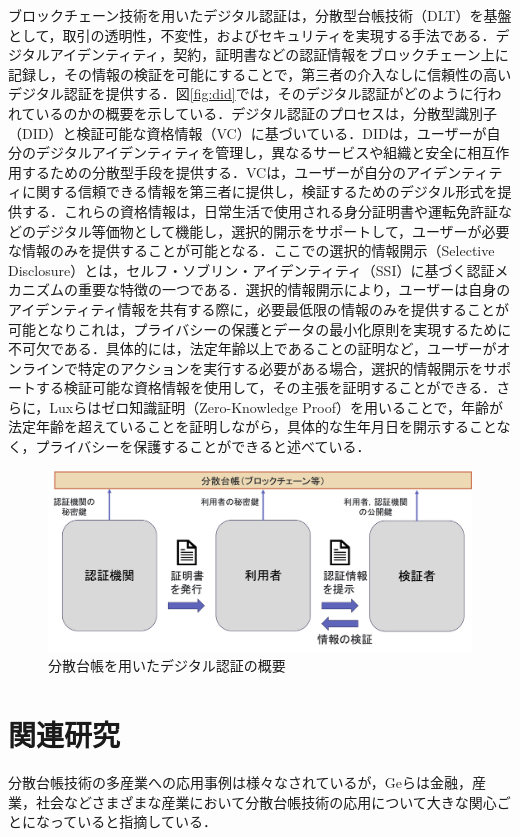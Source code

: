 \documentclass[11pt,dvipdfmx]{jreport}
\begin{document}
ブロックチェーン技術を用いたデジタル認証は，分散型台帳技術（DLT）を基盤として，取引の透明性，不変性，およびセキュリティを実現する手法である．デジタルアイデンティティ，契約，証明書などの認証情報をブロックチェーン上に記録し，その情報の検証を可能にすることで，第三者の介入なしに信頼性の高いデジタル認証を提供する．図\ref{fig:did}では，そのデジタル認証がどのように行われているのかの概要を示している．デジタル認証のプロセスは，分散型識別子（DID）と検証可能な資格情報（VC）に基づいている．DIDは，ユーザーが自分のデジタルアイデンティティを管理し，異なるサービスや組織と安全に相互作用するための分散型手段を提供する．VCは，ユーザーが自分のアイデンティティに関する信頼できる情報を第三者に提供し，検証するためのデジタル形式を提供する．これらの資格情報は，日常生活で使用される身分証明書や運転免許証などのデジタル等価物として機能し，選択的開示をサポートして，ユーザーが必要な情報のみを提供することが可能となる．ここでの選択的情報開示（Selective Disclosure）とは，セルフ・ソブリン・アイデンティティ（SSI）に基づく認証メカニズムの重要な特徴の一つである．選択的情報開示により，ユーザーは自身のアイデンティティ情報を共有する際に，必要最低限の情報のみを提供することが可能となりこれは，プライバシーの保護とデータの最小化原則を実現するために不可欠である\cite{dezital}．具体的には，法定年齢以上であることの証明など，ユーザーがオンラインで特定のアクションを実行する必要がある場合，選択的情報開示をサポートする検証可能な資格情報を使用して，その主張を証明することができる．さらに，Luxらはゼロ知識証明（Zero-Knowledge Proof）を用いることで，年齢が法定年齢を超えていることを証明しながら，具体的な生年月日を開示することなく，プライバシーを保護することができると述べている\cite{dezital}．

\begin{figure}[t]
	\includegraphics[width=1.0\linewidth]{Haraguchi_fig/dezitaruni.pdf}
	\caption{分散台帳を用いたデジタル認証の概要}
	\label{fig:ninteisyou}
\end{figure}


\section{関連研究}
分散台帳技術の多産業への応用事例は様々なされているが，Geらは金融，産業，社会などさまざまな産業において分散台帳技術の応用について大きな関心ごとになっていると指摘している\cite{yuukisukunai}．
\end{document}
